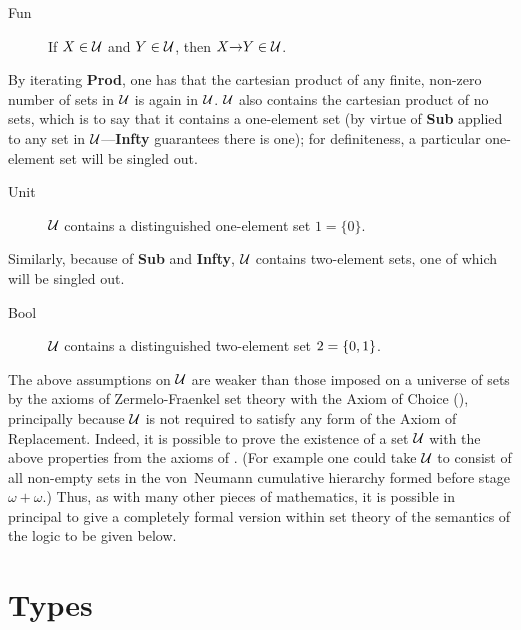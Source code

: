 \begin{description}

\item[Fun] If $X\in{\cal U}$ and $Y\in{\cal U}$, then $X{\to} Y\in{\cal U}$.

\end{description}
By iterating {\bf Prod}, one has that the cartesian product of any
finite, non-zero number of sets in $\cal U$ is again in $\cal U$.
$\cal U$ also contains the cartesian product of no sets, which is to
say that it contains a one-element set (by virtue of {\bf Sub} applied
to any set in ${\cal U}$---{\bf Infty} guarantees there is one); for
definiteness, a particular one-element set will be singled out.
\begin{description}

\item[Unit] $\cal U$ contains a distinguished one-element set $1=\{0\}$.

\end{description}
Similarly, because of {\bf Sub} and {\bf Infty}, $\cal U$ contains
two-element sets, one of which will be singled out.
\begin{description}

\item[Bool] $\cal U$ contains a distinguished two-element set
$\mbox{\rm 2}=\{0,1\}$.

\end{description}

The above assumptions on $\cal U$ are weaker than those imposed on a
universe of sets by the axioms of
Zermelo-Fraenkel set theory with the
Axiom of Choice (),
principally because $\cal U$ is not
required to satisfy any form of the Axiom of
Replacement.
Indeed, it is possible to prove the existence of a set
$\cal U$ with the above properties from the axioms of .
(For example one could take $\cal U$ to consist of all non-empty sets
in the von~Neumann cumulative hierarchy formed before stage
$\omega+\omega$.) Thus, as with many other pieces of mathematics, it is
possible in principal to give a completely formal version within
 set theory of the semantics of the \HOL{} logic to be given
below.

\section{Types}
\label{types}


